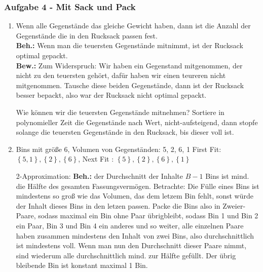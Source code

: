 \documentclass[11pt]{scrartcl}
\newcommand{\task}[1]{\subsubsection*{#1}}
\begin{document}
\task{Aufgabe 4 - Mit Sack und Pack}
\begin{enumerate}[label=(\alph*)]
	\item 
		Wenn alle Gegenstände das gleiche Gewicht haben, dann ist die Anzahl der Gegenstände die in den Rucksack passen fest.\\
		\textbf{Beh.:} Wenn man die teuersten Gegenstände mitnimmt, ist der Rucksack optimal gepackt.\\
		\textbf{Bew.:} Zum Widerspruch: Wir haben ein Gegenstand mitgenommen, der nicht zu den teuersten gehört, dafür haben wir einen teureren nicht mitgenommen.
		Tausche diese beiden Gegenstände, dann ist der Rucksack besser bepackt, also war der Rucksack nicht optimal gepackt.

		Wie können wir die teuersten Gegenstände mitnehmen? Sortiere in polynomieller Zeit die Gegenstände nach Wert, nicht-aufsteigend, dann stopfe solange die teuersten Gegenstände in den Rucksack, bis dieser voll ist.
	\item 
		Bins mit größe 6, Volumen von Gegenständen: 5, 2, 6, 1
		First Fit: $ \left\{ 5, 1 \right\} , \left\{ 2 \right\} , \left\{ 6 \right\}  $,
		Next Fit : $ \left\{ 5 \right\} , \left\{ 2 \right\} , \left\{ 6 \right\}, \left\{ 1 \right\}   $

		2-Approximation:
		\textbf{Beh.:} der Durchschnitt der Inhalte $ B - 1 $ Bins ist mind. die Hälfte des gesamten Fassungsvermögen.
		Betrachte: Die Fülle eines Bins ist mindestens so groß wie das Volumen, das dem letzem Bin fehlt, sonst würde der Inhalt dieses Bins in den letzen passen.
		Packe die Bins also in Zweier-Paare, sodass maximal ein Bin ohne Paar übrigbleibt, sodass Bin 1 und Bin 2 ein Paar, Bin 3 und Bin 4 ein anderes und so weiter, alle einzelnen Paare haben zusammen mindestens den Inhalt von zwei Bins, also durchschnittlich ist mindestens voll.
		Wenn man nun den Durchschnitt dieser Paare nimmt, sind wiederum alle durchschnittlich mind. zur Hälfte gefüllt.
		Der übrig bleibende Bin ist konstant maximal 1 Bin.

\end{enumerate}
\end{document}

